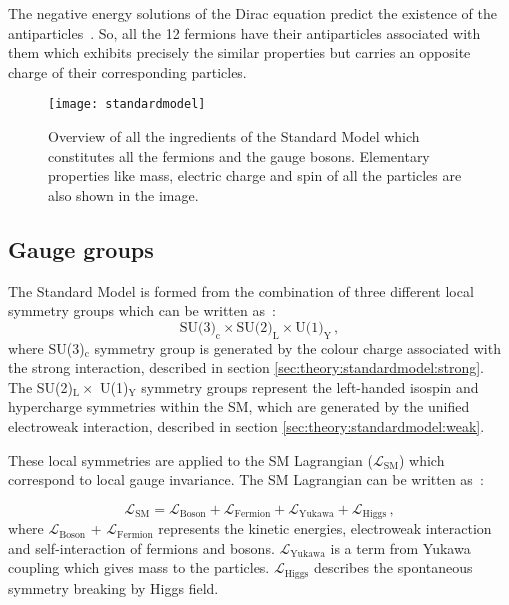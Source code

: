 The negative energy solutions of the Dirac equation predict the existence of the antiparticles~\cite{thomson}. So, all the 12 fermions have their antiparticles associated with them which exhibits precisely
the similar properties but carries an opposite charge of their corresponding particles.

\begin{figure}[hbt!]
	\centering
	\texttt{[image: standardmodel]}
	\caption{Overview of all the ingredients of the Standard Model which constitutes all the fermions and the gauge bosons. Elementary properties like mass, electric charge and spin of all the particles are also shown in the image.~\cite{standardmodelpicture}}
	\label{fig:theory:standardmodel}
\end{figure}



\subsection{Gauge groups}%
\label{sec:theory:standardmodel:gauge}
The Standard Model is formed from the combination of three different local symmetry groups which can be written as~\cite{halzen}:
\begin{equation}
\text{SU(3)}_{\text{c}} \times \text{SU(2)}_{\text{L}} \times \text{U(1)}_{\text{Y}} \,,
\end{equation}
where SU(3)$_{\text{c}}$ symmetry group is generated by the colour charge associated with the strong interaction, described in section \ref{sec:theory:standardmodel:strong}. The SU(2)$_{\text{L}} \times$ U(1)$_{\text{Y}}$ symmetry groups represent the left-handed isospin and hypercharge symmetries within the SM, which are generated by the unified electroweak interaction, described in section \ref{sec:theory:standardmodel:weak}. 

These local symmetries are applied to the SM Lagrangian ($\mathcal{L}_{\text{SM}}$) which correspond to local gauge invariance. The SM Lagrangian can be written as~\cite{halzen}:

\begin{equation}
\mathcal{L}_{\text{SM}} = \mathcal{L}_{\text{Boson}} + \mathcal{L}_{\text{Fermion}} + \mathcal{L}_{\text{Yukawa}} + \mathcal{L}_{\text{Higgs}} \,,
\end{equation}
where $\mathcal{L}_{\text{Boson}}$ + $\mathcal{L}_{\text{Fermion}}$ represents the kinetic energies, electroweak interaction and self-interaction of fermions and bosons. $\mathcal{L}_{\text{Yukawa}}$ is a term from Yukawa coupling which gives mass to the particles. $\mathcal{L}_{\text{Higgs}}$ describes the spontaneous symmetry breaking by Higgs field.


